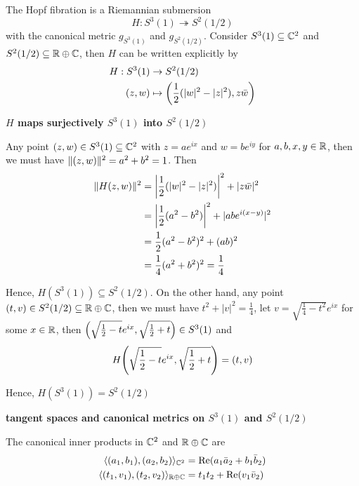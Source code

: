 
\begin{problem}
	The Hopf fibration is a Riemannian submersion
	$$
		H: S^3(1) \twoheadrightarrow S^2(1/2)
	$$
	with the canonical metric $g_{S^3(1)}$ and $g_{S^2(1/2)}$. Consider $S^{3}(1) \subseteq \C^2$ and $S^2(1/2) \subseteq \R \oplus \C$, then $H$ can be written explicitly by
	\begin{align*}
		H: S^3(1) &\to S^2(1/2) \\
			(z, w) &\mapsto \tuple*{\frac{1}{2}(\abs{w}^2 - \abs{z}^2), z \bar{w}}
	\end{align*}
\end{problem}

\begin{longproof}
	\textbf{$H$ maps surjectively $S^3(1)$ into $S^2(1/2)$}
	
	Any point $(z, w) \in S^3(1) \subseteq \C^2$ with $z = a e^{ix}$ and $w = b e^{iy}$ for $a, b, x, y \in \R$, then we must have $\norm{(z, w)}^2 = a^2 + b^2 = 1$. Then
	\begin{align*}
		\norm{H(z, w)}^2 
		&= \abs*{\frac{1}{2}(\abs{w}^2 - \abs{z}^2)}^2 + \abs{z \bar{w}}^2 \\
		&= \abs*{\frac{1}{2}(a^2 - b^2)}^2 + \abs{ab e^{i(x-y)}}^2 \\
		&= \frac{1}{2}(a^2 - b^2)^2 + (ab)^2 \\
		&= \frac{1}{4} (a^2 + b^2)^2 = \frac{1}{4}
	\end{align*}
	
	Hence, $H(S^3(1)) \subseteq S^2(1/2)$. On the other hand, any point $(t, v) \in S^2(1/2) \subseteq \R \oplus \C$, then we must have $t^2 + |v|^2 = \frac{1}{4}$, let $v = \sqrt{\frac{1}{4} - t^2} e^{ix}$ for some $x \in \R$, then $\tuple*{\sqrt{\frac{1}{2} - t} e^{ix}, \sqrt{\frac{1}{2} + t}} \in S^3(1)$ and 
	$$
		H\tuple*{\sqrt{\frac{1}{2} - t} e^{ix}, \sqrt{\frac{1}{2} + t}} = (t, v)
	$$
	
	Hence, $H(S^3(1)) = S^2(1/2)$
	
	\textbf{tangent spaces and canonical metrics on $S^3(1)$ and $S^{2}(1/2)$}
	
	The canonical inner products in $\C^2$ and $\R \oplus \C$ are
	\begin{align*}
		\inner{(a_1, b_1), (a_2, b_2)}_{\C^2} &= \real(a_1 \bar{a}_2 + b_1 \bar{b}_2) \\
		\inner{(t_1, v_1), (t_2, v_2)}_{\R \oplus \C} &= t_1 t_2 + \real(v_1 \bar{v}_2)
	\end{align*}
	

\end{longproof}
